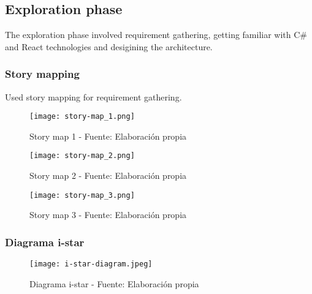 \subsection{Exploration phase}
The exploration phase involved requirement gathering, getting familiar with C\# and React technologies and desigining the architecture.

\subsubsection{Story mapping}
Used story mapping for requirement gathering.
\begin{figure}[H]
    \centering
    \texttt{[image: story-map\_1.png]}
    \caption{Story map 1 - Fuente: Elaboración propia}
    \label{fig:story_map_1}
\end{figure}
\begin{figure}[H]
    \centering
    \texttt{[image: story-map\_2.png]}
    \caption{Story map 2 - Fuente: Elaboración propia}
    \label{fig:story_map_2}
\end{figure}
\begin{figure}[H]
    \centering
    \texttt{[image: story-map\_3.png]}
    \caption{Story map 3 - Fuente: Elaboración propia}
    \label{fig:story_map_3}
\end{figure}

\subsubsection{Diagrama i-star}
\begin{figure}[H]
    \centering
    \texttt{[image: i-star-diagram.jpeg]}
    \caption{Diagrama i-star - Fuente: Elaboración propia}
    \label{fig:i-star}
\end{figure}

